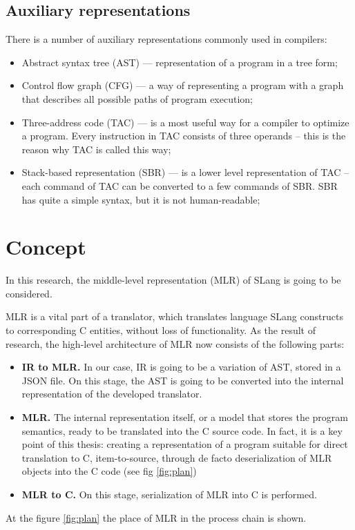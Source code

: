 \subsection{Auxiliary representations}
There is a number of auxiliary representations commonly used in compilers\cite{UMDIR}:
\begin{itemize}
    \item Abstract syntax tree (AST) --- representation of a program in a tree form;
    \item Control flow graph (CFG) --- a way of representing a program with a graph that describes all possible paths of program execution;
    \item Three-address code (TAC) --- is a most useful way for a compiler to optimize a program. Every instruction in TAC consists of three operands  -- this is the reason why TAC is called this way; %
    \item Stack-based representation (SBR) --- is a lower level representation of TAC -- each command of TAC can be converted to a few commands of SBR. SBR has quite a simple syntax, but it is not human-readable; 
\end{itemize}


\section{Concept}
In this research, the middle-level representation (MLR) of SLang is going to be considered.

MLR is a vital part of a translator, which translates language SLang constructs to corresponding C entities, without loss of functionality. 
As the result of research, the high-level architecture of MLR now consists of the following parts:

\begin{itemize}
    \item \textbf{IR to MLR.} In our case, IR is going to be a variation of AST, stored in a JSON file. On this stage, the AST is going to be converted into the internal representation of the developed translator.
    \item \textbf{MLR.} The internal representation itself, or a model that stores the program semantics, ready to be translated into the C source code. In fact, it is a key point of this thesis: creating a representation of a program suitable for direct translation to C, item-to-source, through de facto deserialization of MLR objects into the C code (see fig \ref{fig:plan})
    \item \textbf{MLR to C.} On this stage, serialization of MLR into C is performed.
\end{itemize}
At the figure \ref{fig:plan} the place of MLR in the process chain is shown.  

